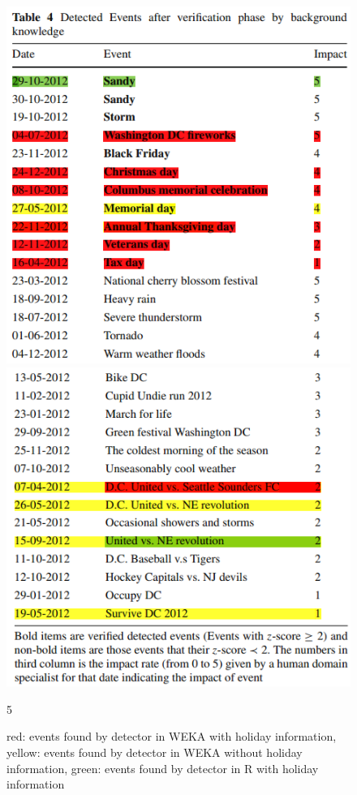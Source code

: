 \documentclass[12pt]{article}
\begin{document}
 	\begin{figure}[H]
 		\centering
 		\begin{minipage}{.48\textwidth}
 			\centering
 			\includegraphics[width=\linewidth]{figures/event_Gama1.png}
 		\end{minipage}%
 		\begin{minipage}{.48\textwidth}
 			\centering
 			\includegraphics[width=\linewidth]{figures/event_Gama2.png}
 		\end{minipage}
 		5\caption{red: events found by detector in WEKA with holiday information, yellow: events found by detector in WEKA without holiday information, green: events found by detector in R with holiday information}
 	\end{figure}
\end{document}
